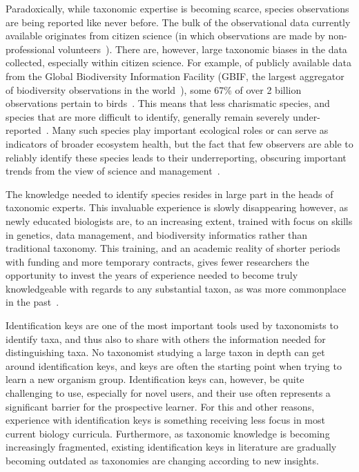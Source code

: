\documentclass[10pt,letterpaper]{article}
\begin{document}
Paradoxically, while taxonomic expertise is becoming scarce, species observations are being reported like never before. The bulk of the observational data currently available originates from citizen science (in which observations are made by non-professional volunteers~\cite{Silvertown2009}). There are, however, large taxonomic biases in the data collected, especially within citizen science. For example, of publicly available data from the Global Biodiversity Information Facility (GBIF, the largest aggregator of biodiversity observations in the world~\cite{GBIFhomepage}), some 67\% of over 2 billion observations pertain to birds~\cite{GBIF_data_taxonomy}. This means that less charismatic species, and species that are more difficult to identify, generally remain severely under-reported~\cite{Troudet2017}. Many such species play important ecological roles or can serve as indicators of broader ecosystem health, but the fact that few observers are able to reliably identify these species leads to their underreporting, obscuring important trends from the view of science and management~\cite{Dobson2020}.

The knowledge needed to identify species resides in large part in the heads of taxonomic experts. This invaluable experience is slowly disappearing however, as newly educated biologists are, to an increasing extent, trained with focus on skills in genetics, data management, and biodiversity informatics rather than traditional taxonomy. This training, and an academic reality of shorter periods with funding and more temporary contracts, gives fewer researchers the opportunity to invest the years of experience needed to become truly knowledgeable with regards to any substantial taxon, as was more commonplace in the past~\cite{Ebach2011}. 
                   
Identification keys are one of the most important tools used by taxonomists to identify taxa, and thus also to share with others the information needed for distinguishing taxa. No taxonomist studying a large taxon in depth can get around identification keys, and keys are often the starting point when trying to learn a new organism group. Identification keys can, however, be quite challenging to use, especially for novel users, and their use often represents a significant barrier for the prospective learner. For this and other reasons, experience with identification keys is something receiving less focus in most current biology curricula. Furthermore, as taxonomic knowledge is becoming increasingly fragmented, existing identification keys in literature are gradually becoming outdated as taxonomies are changing according to new insights.
\end{document}
